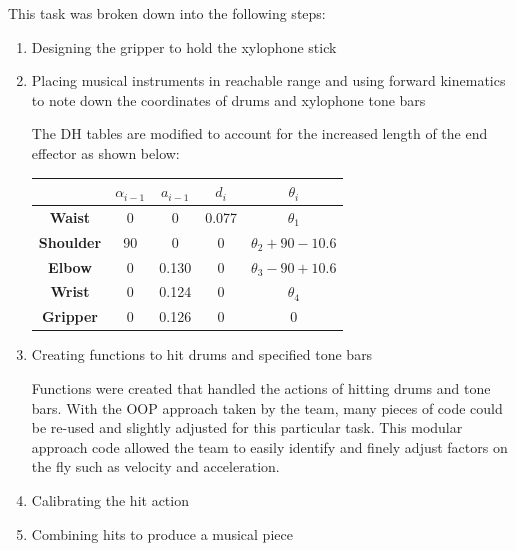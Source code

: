\documentclass[9pt, a4paper]{article}
\begin{document}
This task was broken down into the following steps:
\begin{enumerate}
  \item Designing the gripper to hold the xylophone stick 
  
  
  \item Placing musical instruments in reachable range and using forward
  kinematics to note down the coordinates of drums and xylophone tone bars
  
  The DH tables are modified to account for the increased length of the end
  effector as shown below:
  \begin{table}[h]
    \centering
    \begin{tabular}{|c|c|c|c|c|}
    \hline
    {\textbf{}} & {\textbf{$\alpha_{i-1}$}} & { \textbf{$a_{i-1}$}} & { \textbf{$d_i$}} & { \textbf{$\theta_i$}} \\ \hline
    \textbf{Waist}           & 0                             & 0                        & 0.077                & $\theta_1$                \\ \hline
    \textbf{Shoulder}           & 90                            & 0                        & 0                    & $\theta_2 + 90 - 10.6$    \\ \hline
    \textbf{Elbow}           & 0                             & 0.130                    & 0                    & $\theta_3 - 90 + 10.6$    \\ \hline
    \textbf{Wrist}           & 0                             & 0.124                    & 0                    & $\theta_4$                \\ \hline
    \textbf{Gripper}           & 0                             & 0.126                    & 0                    & 0                         \\ \hline
    \end{tabular}
  \end{table}


  \item Creating functions to hit drums and specified tone bars 
  
  Functions were created that handled the actions of hitting drums and tone
  bars. With the OOP approach taken by the team, many pieces of code could be
  re-used and slightly adjusted for this particular task. This modular approach
  code allowed the team to easily identify and finely adjust factors on the fly such as
  velocity and acceleration. 
  
  \item Calibrating the hit action 
  
  \item Combining hits to produce a musical piece 
\end{enumerate}
\end{document}
